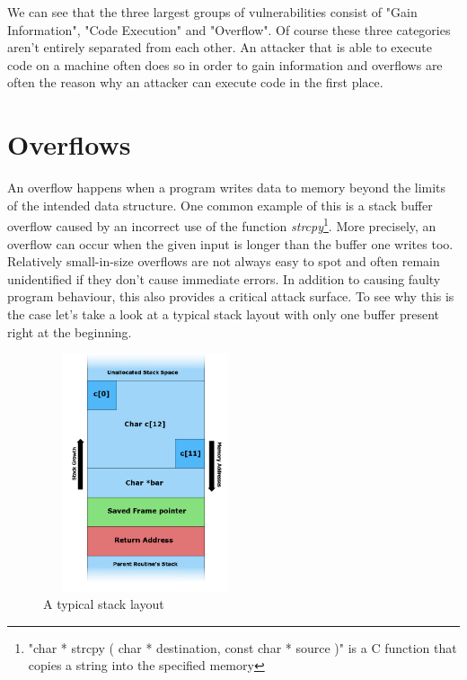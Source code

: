 \documentclass[10pt,twocolumn,a4paper]{article}
\begin{document}
We can see that the three largest groups of vulnerabilities consist of "Gain Information", "Code Execution" and "Overflow".
Of course these three categories aren't entirely separated from each other.
An attacker that is able to execute code on a machine often does so in order to gain information and overflows are often the reason why an attacker can execute code in the first place.
\section{Overflows}\label{sec:Overflows}
An overflow happens when a program writes data to memory beyond the limits of the intended data structure.
One common example of this is a stack buffer overflow caused by an incorrect use of the function \emph{strcpy}\footnote{"char * strcpy ( char * destination, const char * source )" is a C function that copies a string into the specified memory}.
More precisely, an overflow can occur when the given input is longer than the buffer one writes too.
Relatively small-in-size overflows are not always easy to spot and often remain unidentified if they don't cause immediate errors.
In addition to causing faulty program behaviour, this also provides a critical attack surface.
To see why this is the case let's take a look at a typical stack layout with only one buffer present right at the beginning.
\begin{figure}[h]
	\begin{center}
		\includegraphics[height=7cm,width=6cm]{fig/Stack_Overflow}
		\caption{A typical stack layout}
	\end{center}
\end{figure}
\newline
\end{document}
